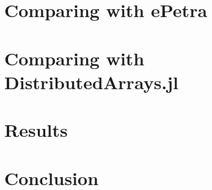 \documentclass{article}
\begin{document}

\section{Comparing with ePetra}





\section{Comparing with DistributedArrays.jl}


\section{Results}





\section{Conclusion}





\end{document}
